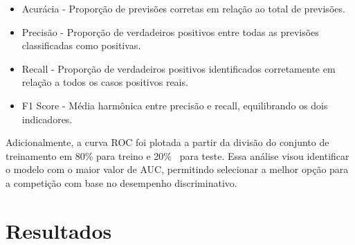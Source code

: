 \documentclass[10pt, conference, compsocconf]{IEEEtran}
\begin{document}
\vspace{0.3cm}

\begin{itemize}
  \item Acurácia - Proporção de previsões corretas em relação ao total de previsões.
  \item Precisão - Proporção de verdadeiros positivos entre todas as previsões classificadas como positivas.
  \item Recall - Proporção de verdadeiros positivos identificados corretamente em relação a todos os casos positivos reais.
  \item F1 Score - Média harmônica entre precisão e recall, equilibrando os dois indicadores.
\end{itemize}

  \vspace{0.3cm}

  Adicionalmente, a curva ROC foi plotada a partir da divisão do conjunto de treinamento em 80\% para treino e 20\% \
  para teste. Essa análise visou identificar o modelo com o maior valor de AUC, permitindo selecionar a melhor opção para a competição 
  com base no desempenho discriminativo.



\section{Resultados}
\end{document}
